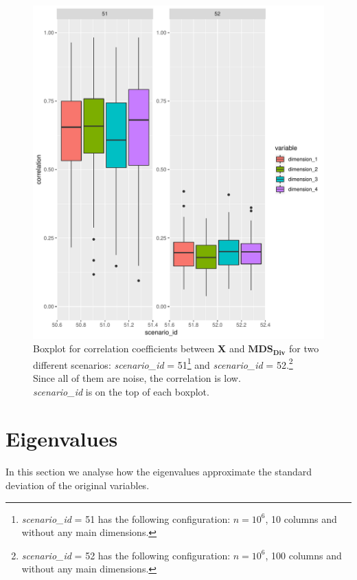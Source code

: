 \documentclass[11pt]{report}
\begin{document}
\begin{figure}
\begin{minipage}{\textwidth}
    \includegraphics[scale = 2.5]{./images/noisy_corr_divide.pdf}
    \caption[bbb]{
    Boxplot for correlation coefficients between \textbf{X} and 
    $\mathbf{MDS_{Div}}$ for two different scenarios: 
    \textit{scenario\_id} = 51\footnote{\textit{scenario\_id} = 51 
    has the following configuration: $n=10^6$, 10 columns and without any main 
    dimensions.} 
    and \textit{scenario\_id} = 52.\footnote{\textit{scenario\_id} = 52 
    has the following configuration: $n=10^6$, 100 columns and without any main 
    dimensions.} \\ 
    Since all of them are noise, the correlation is low.\\ 
    \textit{scenario\_id} is on the top of each boxplot. 
    } 
    \label{noisy_corr_divide}
\end{minipage}
\end{figure}

\FloatBarrier


\section{Eigenvalues}
In this section we analyse how the eigenvalues approximate the standard 
deviation of the original variables. 
\end{document}
